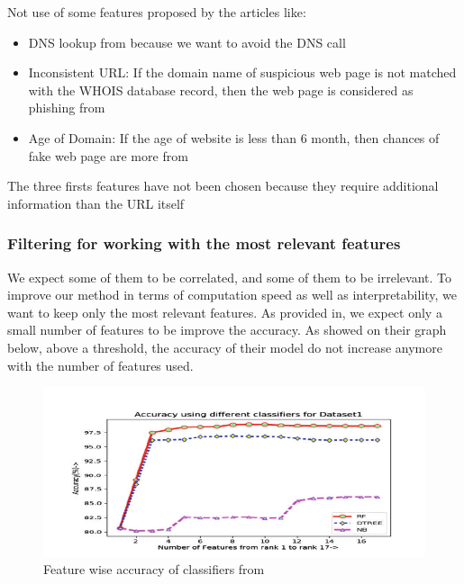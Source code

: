 \documentclass{article}
\begin{document}
    Not use of some features proposed by the articles like:
    \begin{itemize}
        \item DNS lookup from\cite{PhishSafe} because we want to avoid the DNS call
        \item Inconsistent URL: If the domain name of suspicious web page is not matched
        with the WHOIS database record, then the web page is considered as phishing from\cite{PhishSafe}
        \item Age of Domain: If the age of website is less than 6 month, then chances of fake
        web page are more from\cite{PhishSafe}
    \end{itemize}
    The three firsts features have not been chosen because they require additional information than the URL itself

    \subsubsection{Filtering for working with the most relevant features}

    We expect some of them to be correlated, and some of them to be irrelevant.
    To improve our method in terms of computation speed as well as interpretability, we want to keep only the most relevant features.
    As provided in\cite{LexicalFeatureSelection}, we expect only a small number of features to be improve the accuracy.
    As showed on their graph below, above a threshold, the accuracy of their model do not increase anymore with the number of features used.

    \begin{figure}[H]
        \centering
        \includegraphics[width=\textwidth]{report_img/lexicalfeatureselectionaccuracygraph}
        \caption{Feature wise accuracy of classifiers from\cite{LexicalFeatureSelection}}
        \label{fig:}
    \end{figure}
\end{document}
